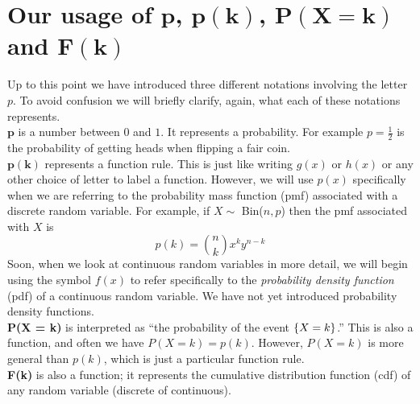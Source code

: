 \begin{center}
\end{center}







\section{Our usage of $\boldsymbol{p}$, $\boldsymbol{p(k)}$, $\boldsymbol{P(X = k)}$ and $\boldsymbol{F(k)}$} \label{pp(k)P(X=k)f(k)F(K)}
Up to this point we have introduced three different notations involving the letter $p$. To avoid confusion we will briefly clarify, again, what each of these notations represents. \\

\noindent \textbf{$\boldsymbol{p}$} is a number between $0$ and $1$. It represents a probability. For example $p = \frac{1}{2}$ is the probability of getting heads when flipping a fair coin. \\

\noindent \textbf{$\boldsymbol{p(k)}$} represents a function rule. This is just like writing $g(x)$ or $h(x)$ or any other choice of letter to label a function. However, we will use $p(x)$ specifically when we are referring to the probability mass function (pmf) associated with a discrete random variable. For example, if $X \sim $ Bin($n,p$) then the pmf associated with $X$ is
\[
p(k) = \binom{n}{k}x^ky^{n-k}
\]
Soon, when we look at continuous random variables in more detail, we will begin using the symbol $f(x)$ to refer specifically to the \textit{probability density function} (pdf) of a continuous random variable. We have not yet introduced probability density functions. \\

\noindent \textbf{P(X = k)} is interpreted as ``the probability of the event $\left\{X = k\right\}$.'' This is also a function, and often we have $P(X = k) = p(k)$. However, $P(X = k)$ is more general than $p(k)$, which is just a particular function rule. \\

\noindent \textbf{F(k)} is also a function; it represents the cumulative distribution function (cdf) of any random variable (discrete of continuous).


















